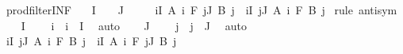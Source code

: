 \begin{isabellebody}
\endisatagproof
{\isafoldproof}%
%
\isadelimproof
\isanewline
%
\endisadelimproof
\isanewline
{}\isamarkupfalse%
\ prod{\isacharunderscore}{\kern0pt}filter{\isacharunderscore}{\kern0pt}INF{\isacharcolon}{\kern0pt}\isanewline
\ \ \ {\isachardoublequoteopen}I\ {\isasymnoteq}\ {\isacharbraceleft}{\kern0pt}{\isacharbraceright}{\kern0pt}{\isachardoublequoteclose}\ \ {\isachardoublequoteopen}J\ {\isasymnoteq}\ {\isacharbraceleft}{\kern0pt}{\isacharbraceright}{\kern0pt}{\isachardoublequoteclose}\isanewline
\ \ \ {\isachardoublequoteopen}{\isacharparenleft}{\kern0pt}{\isasymSqinter}i{\isasymin}I{\isachardot}{\kern0pt}\ A\ i{\isacharparenright}{\kern0pt}\ {\isasymtimes}\isactrlsub F\ {\isacharparenleft}{\kern0pt}{\isasymSqinter}j{\isasymin}J{\isachardot}{\kern0pt}\ B\ j{\isacharparenright}{\kern0pt}\ {\isacharequal}{\kern0pt}\ {\isacharparenleft}{\kern0pt}{\isasymSqinter}i{\isasymin}I{\isachardot}{\kern0pt}\ {\isasymSqinter}j{\isasymin}J{\isachardot}{\kern0pt}\ A\ i\ {\isasymtimes}\isactrlsub F\ B\ j{\isacharparenright}{\kern0pt}{\isachardoublequoteclose}\isanewline
%
\isadelimproof
%
\endisadelimproof
%
\isatagproof
{}\isamarkupfalse%
\ {\isacharparenleft}{\kern0pt}rule\ antisym{\isacharparenright}{\kern0pt}\isanewline
\ \ \isamarkupfalse%
\ {\isacartoucheopen}I\ {\isasymnoteq}\ {\isacharbraceleft}{\kern0pt}{\isacharbraceright}{\kern0pt}{\isacartoucheclose}\ \isamarkupfalse%
\ i\ \ {\isachardoublequoteopen}i\ {\isasymin}\ I{\isachardoublequoteclose}\ \isamarkupfalse%
\ auto\isanewline
\ \ \isamarkupfalse%
\ {\isacartoucheopen}J\ {\isasymnoteq}\ {\isacharbraceleft}{\kern0pt}{\isacharbraceright}{\kern0pt}{\isacartoucheclose}\ \isamarkupfalse%
\ j\ \ {\isachardoublequoteopen}j\ {\isasymin}\ J{\isachardoublequoteclose}\ \isamarkupfalse%
\ auto\isanewline
\isanewline
\ \ \isamarkupfalse%
\ {\isachardoublequoteopen}{\isacharparenleft}{\kern0pt}{\isasymSqinter}i{\isasymin}I{\isachardot}{\kern0pt}\ {\isasymSqinter}j{\isasymin}J{\isachardot}{\kern0pt}\ A\ i\ {\isasymtimes}\isactrlsub F\ B\ j{\isacharparenright}{\kern0pt}\ {\isasymle}\ {\isacharparenleft}{\kern0pt}{\isasymSqinter}i{\isasymin}I{\isachardot}{\kern0pt}\ A\ i{\isacharparenright}{\kern0pt}\ {\isasymtimes}\isactrlsub F\ {\isacharparenleft}{\kern0pt}{\isasymSqinter}j{\isasymin}J{\isachardot}{\kern0pt}\ B\ j{\isacharparenright}{\kern0pt}{\isachardoublequoteclose}\isanewline
\ \ \ \ \isamarkupfalse%

\end{isabellebody}
